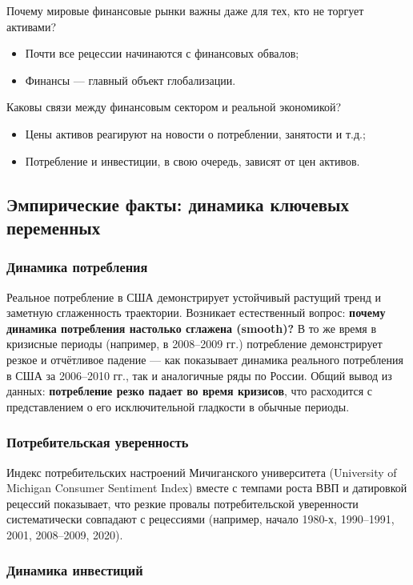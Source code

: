 \documentclass[10pt,a4paper]{article}
\begin{document}
Почему мировые финансовые рынки важны даже для тех, кто не торгует активами?
\begin{itemize}
\item Почти все рецессии начинаются с финансовых обвалов;
\item Финансы — главный объект глобализации.
\end{itemize}
 
Каковы связи между финансовым сектором и реальной экономикой?
\begin{itemize}
\item Цены активов реагируют на новости о потреблении, занятости и т.д.;
\item Потребление и инвестиции, в свою очередь, зависят от цен активов.
\end{itemize}
 
\subsection{Эмпирические факты: динамика ключевых переменных}
 
\subsubsection{Динамика потребления}
 
Реальное потребление в США демонстрирует устойчивый растущий тренд и заметную сглаженность траектории. Возникает естественный вопрос: \textbf{почему динамика потребления настолько сглажена (smooth)?} В то же время в кризисные периоды (например, в 2008--2009 гг.) потребление демонстрирует резкое и отчётливое падение — как показывает динамика реального потребления в США за 2006--2010 гг., так и аналогичные ряды по России. Общий вывод из данных: \textbf{потребление резко падает во время кризисов}, что расходится с представлением о его исключительной гладкости в обычные периоды.
 
\subsubsection{Потребительская уверенность}
 
Индекс потребительских настроений Мичиганского университета (University of Michigan Consumer Sentiment Index) вместе с темпами роста ВВП и датировкой рецессий показывает, что резкие провалы потребительской уверенности систематически совпадают с рецессиями (например, начало 1980-х, 1990--1991, 2001, 2008--2009, 2020).
 
\subsubsection{Динамика инвестиций}
 
\end{document}
